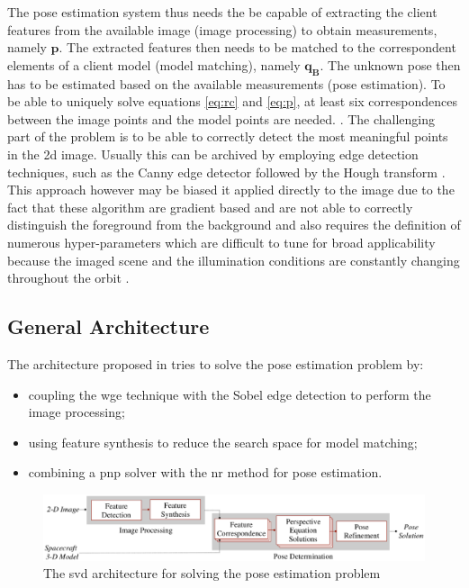 The pose estimation system thus needs the be capable of extracting the client features from the available image (image processing) to obtain measurements, namely  $\mathbf{p}$. The extracted features then needs to be matched to the correspondent elements of a client model (model matching), namely $\mathbf{q_B}$. The unknown pose then has to be estimated based on the available measurements (pose estimation).
To be able to uniquely solve equations \eqref{eq:rc} and \eqref{eq:p}, at least six correspondences between the image points and the model points are needed. \cite{10.1145/358669.358692}. The challenging part of the problem is to be able to correctly detect the most meaningful points in the \acrshort{2d} image. Usually this can be archived by employing edge detection techniques, such as the Canny edge detector \cite{10.1109/TPAMI.1986.4767851} followed by the Hough transform \cite{10.1145/361237.361242}. This approach however may be biased it applied directly to the image due to the fact that these algorithm are gradient based and are not able to correctly distinguish the foreground from the background and also requires the definition of numerous hyper-parameters which are difficult to tune for broad applicability because the imaged scene and the illumination conditions are constantly changing throughout the orbit \cite{Sharma2018}.

\subsection{General Architecture}
The architecture proposed in \cite{Sharma2018} tries to solve the pose estimation problem by:

\begin{itemize}
  \item coupling the \acrfull{wge} technique with the Sobel edge detection to perform the image processing;
  \item using feature synthesis to reduce the search space for model matching;
  \item combining a \acrshort{pnp} solver with the \acrfull{nr} method for pose estimation.
\end{itemize}

\begin{figure}[htbp]
  \centering
  \includegraphics[width=1.0\textwidth]{gfx/SVDPipeline.eps}
  \caption{The \acrshort{svd} architecture for solving the pose estimation problem \cite{Sharma2018}}
  \label{fig:svdArchitecture}
\end{figure}

